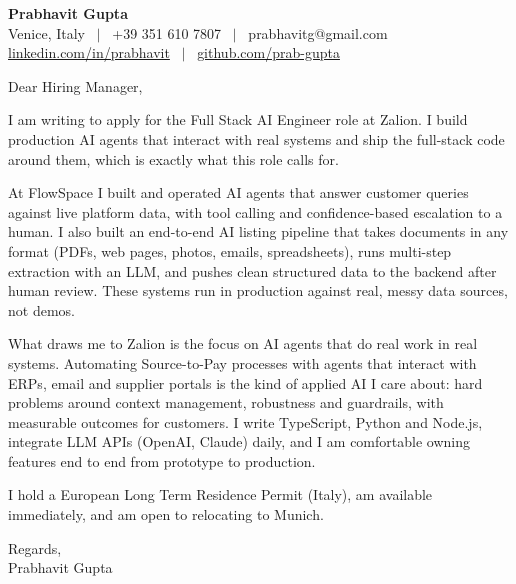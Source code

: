 \documentclass[a4paper,11pt]{article}
\begin{document}
{\large\bfseries Prabhavit Gupta}\\
Venice, Italy ~$\vert$~ +39 351 610 7807 ~$\vert$~ prabhavitg@gmail.com\\
\href{https://linkedin.com/in/prabhavit}{linkedin.com/in/prabhavit} ~$\vert$~ \href{https://github.com/prab-gupta}{github.com/prab-gupta}

\vspace{12pt}

Dear Hiring Manager,

I am writing to apply for the Full Stack AI Engineer role at Zalion. I build production AI agents that interact with real systems and ship the full-stack code around them, which is exactly what this role calls for.

At FlowSpace I built and operated AI agents that answer customer queries against live platform data, with tool calling and confidence-based escalation to a human. I also built an end-to-end AI listing pipeline that takes documents in any format (PDFs, web pages, photos, emails, spreadsheets), runs multi-step extraction with an LLM, and pushes clean structured data to the backend after human review. These systems run in production against real, messy data sources, not demos.

What draws me to Zalion is the focus on AI agents that do real work in real systems. Automating Source-to-Pay processes with agents that interact with ERPs, email and supplier portals is the kind of applied AI I care about: hard problems around context management, robustness and guardrails, with measurable outcomes for customers. I write TypeScript, Python and Node.js, integrate LLM APIs (OpenAI, Claude) daily, and I am comfortable owning features end to end from prototype to production.

I hold a European Long Term Residence Permit (Italy), am available immediately, and am open to relocating to Munich.

Regards,\\
Prabhavit Gupta
\end{document}
